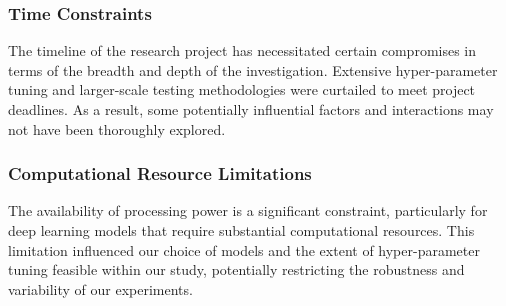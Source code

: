 \documentclass[conference]{IEEEtran}
\begin{document}
\subsubsection{Time Constraints}
The timeline of the research project has necessitated certain compromises in terms of the breadth and depth of the investigation. Extensive hyper-parameter tuning and larger-scale testing methodologies were curtailed to meet project deadlines. As a result, some potentially influential factors and interactions may not have been thoroughly explored.
\subsubsection{Computational Resource Limitations}
The availability of processing power is a significant constraint, particularly for deep learning models that require substantial computational resources. This limitation influenced our choice of models and the extent of hyper-parameter tuning feasible within our study, potentially restricting the robustness and variability of our experiments.











\end{document}

